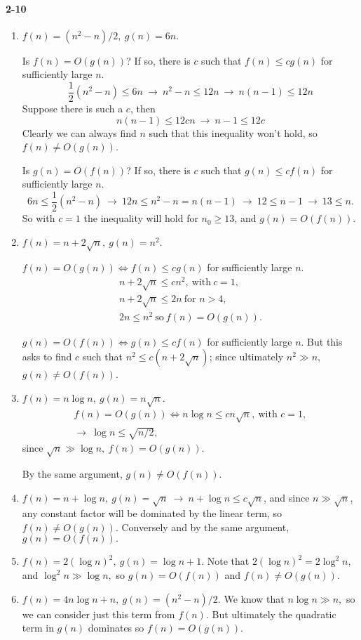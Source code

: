 \documentclass{report}
\begin{document}
\paragraph{2-10}
\begin{enumerate}[label=(\alph*)]
	\item $f(n) = (n^2 - n)/2,\ g(n) = 6n.$

		Is $f(n) = O(g(n))$? If so, there is $c$ such that $f(n) \le cg(n)$ for sufficiently large $n$.
		\[
			\frac{1}{2}(n^2 - n) \le 6n
				\ \to\ n^2 - n \le 12n
				\ \to\ n(n-1) \le 12n
		\]
		Suppose there is such a $c$, then
		\[
			n(n-1) \le 12cn\ \to\ n-1 \le 12c
		\]
		Clearly we can always find $n$ such that this inequality won't hold, so $f(n) \ne O(g(n))$.

		Is $g(n) = O(f(n))$? If so, there is $c$ such that $g(n) \le cf(n)$ for sufficiently large $n$.
		\[
			6n \le \frac{1}{2}(n^2 - n)
			\ \to\ 12n \le n^2 - n = n(n-1)
			\ \to\ 12 \le n - 1
			\ \to\ 13 \le n.
		\]
		So with $c = 1$ the inequality will hold for $n_0 \ge 13$, and $g(n) = O(f(n))$.

	\item $f(n) = n + 2\sqrt{n},\ g(n) = n^2.$

		$f(n) = O(g(n)) \iff f(n) \le cg(n)$ for sufficiently large $n$.
		\begin{gather*}
			n + 2\sqrt{n} \le cn^2,\ \text{with}\ c = 1, \\
			n + 2\sqrt{n} \le 2n\ \text{for $n > 4$}, \\
			2n \le n^2\ \text{so}\ f(n) = O(g(n)).
		\end{gather*}

		$g(n) = O(f(n)) \iff g(n) \le cf(n)$ for sufficiently large $n$. But this asks to find $c$ such that $n^2 \le c(n + 2\sqrt{n})$; since ultimately $n^2 \gg n$, $g(n) \ne O(f(n))$.

	\item $f(n) = n\log n,\ g(n) = n\sqrt{n}.$
		\begin{gather*}
			f(n) = O(g(n)) \iff n\log n \le cn\sqrt{n},\ \text{with $c=1,$} \\
			\to\ \log n \le \sqrt{n/2},
		\end{gather*}
		since $\sqrt{n} \gg \log n,\ f(n) = O(g(n)).$

		By the same argument, $g(n) \ne O(f(n)).$

	\item $f(n) = n + \log n,\ g(n) = \sqrt{n}\ \to\ n + \log n \le c\sqrt{n}$, and since $n \gg \sqrt{n}$, any constant factor will be dominated by the linear term, so $f(n) \ne O(g(n)).$ Conversely and by the same argument, $g(n) = O(f(n)).$

	\item $f(n) = 2(\log n)^2,\ g(n) = \log n + 1.$ Note that $2(\log n)^2 = 2\log^2 n$, and $\log^2 n \gg \log n,$ so $g(n) = O(f(n))$ and $f(n) \ne O(g(n)).$

	\item $f(n) = 4n\log n + n,\ g(n) = (n^2 - n)/2.$ We know that $n\log n \gg n,$ so we can consider just this term from $f(n).$ But ultimately the quadratic term in $g(n)$ dominates so $f(n) = O(g(n)).$
\end{enumerate}
\end{document}

